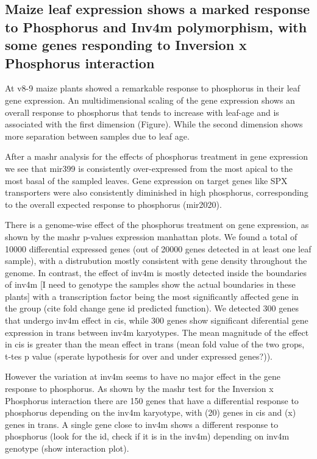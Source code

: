 \subsection{Maize leaf expression shows a marked response to Phosphorus and Inv4m polymorphism, with some genes responding to Inversion x Phosphorus interaction}

At v8-9 maize plants showed a remarkable response to phosphorus in their leaf gene expression.
An multidimensional scaling of the gene expression shows an overall response to phosphorus that tends to increase with leaf-age and is associated with  the first dimension (Figure). 
While the second dimension shows more separation between samples due to leaf age.

After a mashr analysis for the effects of phosphorus treatment in gene expression we see that mir399 is consistently over-expressed from the most apical to the most basal of the sampled leaves.
Gene expression on target genes like SPX transporters were also consistently diminished in high phosphorus, corresponding to the overall expected response to phosphorus (mir2020).

There is a genome-wise effect of the phosphorus treatment on gene expression, as shown by the mashr p-values {expression manhattan plots}. We found a total of 10000 differential expressed genes (out of 20000 genes detected in at least one leaf sample), with a distrubution mostly consistent with gene density throughout the genome. 
In contrast, the effect of inv4m is mostly detected inside the boundaries of inv4m [I need to genotype the samples  show the actual boundaries  in these plants] with a  transcription factor being the most significantly affected gene in the group (cite fold change gene id predicted function).
We detected 300 genes that undergo inv4m effect in cis, while 300 genes show significant diferential gene expression in trans between inv4m karyotypes.
The mean magnitude of the effect in cis is greater than the mean effect in trans (mean fold value of the two grops, t-tes p value (sperate hypothesis for over and under expressed genes?)).

However the variation at inv4m seems to have no major effect in the gene response to phosphorus.
As shown by the mashr test for the Inversion x Phosphorus interaction there are 150 genes that have a differential response to phosphorus depending on the inv4m karyotype, with (20) genes in cis and (x) genes in trans.
A single gene close to inv4m shows a different response  to phosphorus (look for the id, check if it is in the inv4m) depending on inv4m genotype (show interaction plot).


